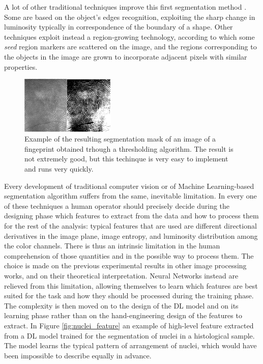 A lot of other traditional techniques improve this first segmentation method \cite{Chouhan2018}. Some are based on the object's edges recognition, exploiting the sharp change in luminosity typically in correspondence of the boundary of a shape. Other techniques exploit instead a region-growing technology, according to which some \textit{seed} region markers are scattered on the image, and the regions corresponding to the objects in the image are grown to incorporate adjacent pixels with similar properties.

\begin{figure}
    \centering
    \includegraphics[width = 0.4\textwidth]{images/fingerprints}
    \caption{Example of the resulting segmentation mask of an image of a fingeprint obtained trhough a thresholding algorithm. The result is not extremely good, but this techinque is very easy to implement and runs very quickly.}
    \label{fig:fing_prints}
\end{figure}

Every development of traditional computer vision or of Machine Learning-based segmentation algorithm suffers from the same, inevitable limitation. In every one of these techniques a human operator should precisely decide during the designing phase which features to extract from the data and how to process them for the rest of the analysis: typical features that are used are different directional derivatives in the image plane, image entropy, and luminosity distribution among the color channels. There is thus an intrinsic limitation in the human comprehension of those quantities and in the possible way to process them. The choice is made on the previous experimental results in other image processing works, and on their theoretical interpretation. Neural Networks instead are relieved from this limitation, allowing themselves to learn which features are best suited for the task and how they should be processed during the training phase. The complexity is then moved on to the design of the DL model and on its learning phase rather than on the hand-engineering design of the features to extract. In Figure \ref{fig:nuclei_feature} an example of high-level feature extracted from a DL model trained for the segmentation of nuclei in a histological sample. The model learns the typical pattern of arrangement of nuclei, which would have been impossible to describe equally in advance.

